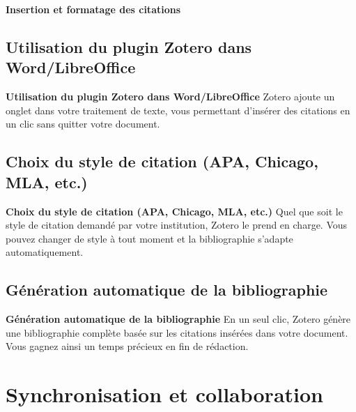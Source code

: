 \documentclass{beamer}
\begin{document}
\begin{frame}{\textbf{Insertion et formatage des citations}}


\subsection{Utilisation du plugin Zotero dans Word/LibreOffice}

\begin{block}{\textbf{Utilisation du plugin Zotero dans Word/LibreOffice}}
Zotero ajoute un onglet dans votre traitement de texte, vous permettant d’insérer des citations en un clic sans quitter votre document.
\end{block}

\subsection{Choix du style de citation (APA, Chicago, MLA, etc.)}

\begin{block}{\textbf{Choix du style de citation (APA, Chicago, MLA, etc.)}}
Quel que soit le style de citation demandé par votre institution, Zotero le prend en charge. Vous pouvez changer de style à tout moment et la bibliographie s'adapte automatiquement.
\end{block}


\subsection{Génération automatique de la bibliographie}

\begin{block}{\textbf{Génération automatique de la bibliographie}}
En un seul clic, Zotero génère une bibliographie complète basée sur les citations insérées dans votre document. Vous gagnez ainsi un temps précieux en fin de rédaction.
\end{block}

\end{frame}

\section{Synchronisation et collaboration}
\end{document}
